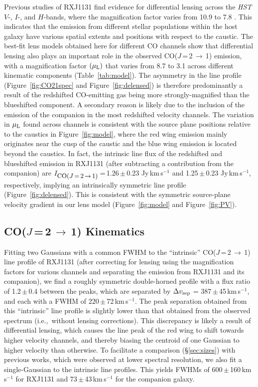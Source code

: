 \documentclass[]{emulateapj}
\newcommand{\rarr}{$\rightarrow$}
\newcommand{\bco}{\mbox{CO($J$\,=\,2\,\rarr\,1)}\xspace}
\newcommand{\kms}{\mbox{km\,s$^{-1}$}\xspace}
\newcommand{\pmm}{\,$\pm$\,}
\newcommand{\ie}{{i.e.,~}}
\newcommand{\Fig}[1]{Figure~\ref{fig:#1}}
\newcommand{\Tab}[1]{Table~\ref{tab:#1}}
\newcommand{\Sec}[1]{\S\ref{sec:#1}}
\begin{document}
Previous studies of RXJ1131 find evidence for differential lensing across
the {\it HST} $V$-, $I$-, and $H$-bands, where the
magnification factor varies from 10.9 to 7.8 .
This indicates that the emission from different stellar populations
within the host galaxy have various spatial extents and positions with respect to the caustic.
The best-fit lens models obtained here for different CO channels show that differential lensing also plays
an important role in the observed \bco emission, with a magnification factor $(\mu_{\rm L})$ that varies
from 8.7 to 3.1 across different kinematic components (\Tab{model}).
The asymmetry in the line profile (\Fig{CO21spec} and \Fig{delensed}) is therefore predominantly a result of
the redshifted CO-emitting gas being more strongly-magnified
than the
blueshifted component.
A secondary reason is likely due to
the inclusion of the emission of the companion in the most redshifted velocity channels.
The variation in $\mu_{\rm L}$ found across channels is consistent with the source plane
positions relative to the caustics in \Fig{model}, where the red wing
emission mainly originates near the cusp
of the caustic and the blue wing emission is located beyond the caustics.
In fact, the intrinsic line flux of the redshifted and
blueshifted emission in RXJ1131 (after subtracting a contribution from the companion)
are $I_{\small \bco}$\,=\,1.26\pmm 0.23 Jy\,\kms and 1.25\pmm0.23 Jy\,\kms, respectively,
implying an intrinsically symmetric line profile (\Fig{delensed}). This is consistent with the symmetric source-plane
velocity gradient in our lens model (\Fig{model} and \Fig{PV}).

\subsection{\bco Kinematics}
Fitting two Gaussians with a common FWHM
to the ``intrinsic'' \bco line profile of RXJ1131 (after correcting for lensing using
the magnification factors for various channels and separating the emission from RXJ1131 and its companion),
we find a roughly symmetric double-horned profile with a flux ratio of 1.2\pmm0.4 between the peaks, which
are separated by
$\Delta v_{\rm sep}$ = 387\pmm45\,\kms, and each with a
FWHM of 220\pmm72\,\kms.
The peak separation obtained from this ``intrinsic'' line profile is
slightly lower than that obtained from the observed spectrum (\ie without lensing corrections).
This discrepancy is likely a result of differential lensing, which causes the line peak of the red wing
to shift towards higher velocity channels, and thereby biasing the centroid of
one Gaussian to higher velocity than otherwise.
To facilitate a comparison (\Sec{sizes}) with previous works, which were observed at lower spectral resolution,
we also fit a single-Gaussian to the intrinsic line profiles.
This yields FWHMs of 600\pmm160\,\kms for RXJ1131
and 73\pmm43\,\kms for the companion galaxy.
\end{document}
